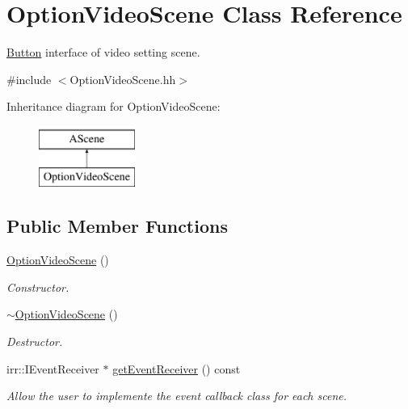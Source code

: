 \hypertarget{classOptionVideoScene}{}\section{Option\+Video\+Scene Class Reference}
\label{classOptionVideoScene}


\hyperlink{classButton}{Button} interface of video setting scene.  




{\ttfamily \#include $<$Option\+Video\+Scene.\+hh$>$}

Inheritance diagram for Option\+Video\+Scene\+:\begin{figure}[H]
\begin{center}
\leavevmode
\includegraphics[height=2.000000cm]{classOptionVideoScene}
\end{center}
\end{figure}
\subsection*{Public Member Functions}
\begin{DoxyCompactItemize}
\item 
\hyperlink{classOptionVideoScene_a4adc5d02ab700ef59733b19183769dea}{Option\+Video\+Scene} ()
\begin{DoxyCompactList}\small\item\em Constructor. \end{DoxyCompactList}\item 
\hyperlink{classOptionVideoScene_aaafd7499ea05590a0d61109ae7bcbf08}{$\sim$\+Option\+Video\+Scene} ()
\begin{DoxyCompactList}\small\item\em Destructor. \end{DoxyCompactList}\item 
irr\+::\+I\+Event\+Receiver $\ast$ \hyperlink{classOptionVideoScene_a84625e871c5176d7abc77a7f12c1472a}{get\+Event\+Receiver} () const
\begin{DoxyCompactList}\small\item\em Allow the user to implemente the event callback class for each scene. \end{DoxyCompactList}\end{DoxyCompactItemize}


